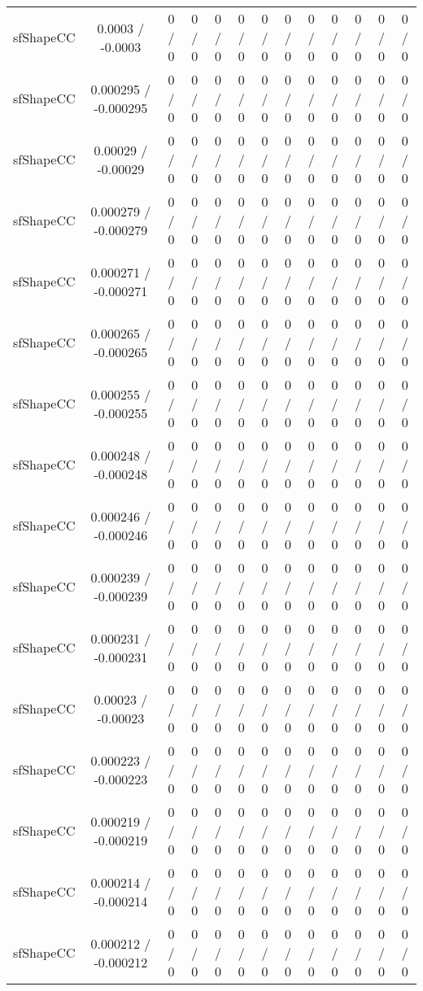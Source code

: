 \documentclass[10pt]{article}
\begin{document}
\begin{table}[htbp]
\begin{center}
\begin{tabular}{|c|c|c|c|c|c|c|c|c|c|c|c|c|}
  sfShapeCC & 0.0003 / -0.0003 & 0 / 0 & 0 / 0 & 0 / 0 & 0 / 0 & 0 / 0 & 0 / 0 & 0 / 0 & 0 / 0 & 0 / 0 & 0 / 0 & 0 / 0 \\ 
  sfShapeCC & 0.000295 / -0.000295 & 0 / 0 & 0 / 0 & 0 / 0 & 0 / 0 & 0 / 0 & 0 / 0 & 0 / 0 & 0 / 0 & 0 / 0 & 0 / 0 & 0 / 0 \\ 
  sfShapeCC & 0.00029 / -0.00029 & 0 / 0 & 0 / 0 & 0 / 0 & 0 / 0 & 0 / 0 & 0 / 0 & 0 / 0 & 0 / 0 & 0 / 0 & 0 / 0 & 0 / 0 \\ 
  sfShapeCC & 0.000279 / -0.000279 & 0 / 0 & 0 / 0 & 0 / 0 & 0 / 0 & 0 / 0 & 0 / 0 & 0 / 0 & 0 / 0 & 0 / 0 & 0 / 0 & 0 / 0 \\ 
  sfShapeCC & 0.000271 / -0.000271 & 0 / 0 & 0 / 0 & 0 / 0 & 0 / 0 & 0 / 0 & 0 / 0 & 0 / 0 & 0 / 0 & 0 / 0 & 0 / 0 & 0 / 0 \\ 
  sfShapeCC & 0.000265 / -0.000265 & 0 / 0 & 0 / 0 & 0 / 0 & 0 / 0 & 0 / 0 & 0 / 0 & 0 / 0 & 0 / 0 & 0 / 0 & 0 / 0 & 0 / 0 \\ 
  sfShapeCC & 0.000255 / -0.000255 & 0 / 0 & 0 / 0 & 0 / 0 & 0 / 0 & 0 / 0 & 0 / 0 & 0 / 0 & 0 / 0 & 0 / 0 & 0 / 0 & 0 / 0 \\ 
  sfShapeCC & 0.000248 / -0.000248 & 0 / 0 & 0 / 0 & 0 / 0 & 0 / 0 & 0 / 0 & 0 / 0 & 0 / 0 & 0 / 0 & 0 / 0 & 0 / 0 & 0 / 0 \\ 
  sfShapeCC & 0.000246 / -0.000246 & 0 / 0 & 0 / 0 & 0 / 0 & 0 / 0 & 0 / 0 & 0 / 0 & 0 / 0 & 0 / 0 & 0 / 0 & 0 / 0 & 0 / 0 \\ 
  sfShapeCC & 0.000239 / -0.000239 & 0 / 0 & 0 / 0 & 0 / 0 & 0 / 0 & 0 / 0 & 0 / 0 & 0 / 0 & 0 / 0 & 0 / 0 & 0 / 0 & 0 / 0 \\ 
  sfShapeCC & 0.000231 / -0.000231 & 0 / 0 & 0 / 0 & 0 / 0 & 0 / 0 & 0 / 0 & 0 / 0 & 0 / 0 & 0 / 0 & 0 / 0 & 0 / 0 & 0 / 0 \\ 
  sfShapeCC & 0.00023 / -0.00023 & 0 / 0 & 0 / 0 & 0 / 0 & 0 / 0 & 0 / 0 & 0 / 0 & 0 / 0 & 0 / 0 & 0 / 0 & 0 / 0 & 0 / 0 \\ 
  sfShapeCC & 0.000223 / -0.000223 & 0 / 0 & 0 / 0 & 0 / 0 & 0 / 0 & 0 / 0 & 0 / 0 & 0 / 0 & 0 / 0 & 0 / 0 & 0 / 0 & 0 / 0 \\ 
  sfShapeCC & 0.000219 / -0.000219 & 0 / 0 & 0 / 0 & 0 / 0 & 0 / 0 & 0 / 0 & 0 / 0 & 0 / 0 & 0 / 0 & 0 / 0 & 0 / 0 & 0 / 0 \\ 
  sfShapeCC & 0.000214 / -0.000214 & 0 / 0 & 0 / 0 & 0 / 0 & 0 / 0 & 0 / 0 & 0 / 0 & 0 / 0 & 0 / 0 & 0 / 0 & 0 / 0 & 0 / 0 \\ 
  sfShapeCC & 0.000212 / -0.000212 & 0 / 0 & 0 / 0 & 0 / 0 & 0 / 0 & 0 / 0 & 0 / 0 & 0 / 0 & 0 / 0 & 0 / 0 & 0 / 0 & 0 / 0 \\ 

\end{tabular}
\end{center}
\end{table}
\end{document}
